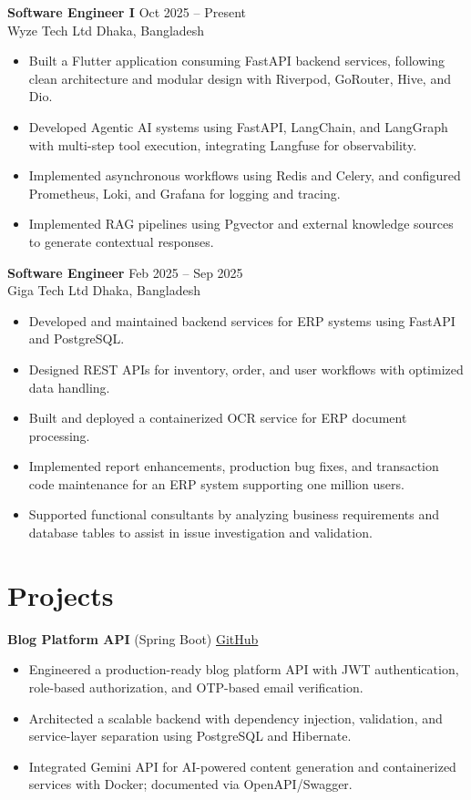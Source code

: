 \documentclass[11pt,a4paper]{article}
\begin{document}
\textbf{Software Engineer I} \hfill Oct 2025 -- Present\\
Wyze Tech Ltd \hfill Dhaka, Bangladesh
\begin{itemize}
    \item Built a Flutter application consuming FastAPI backend services, following clean architecture and modular design with Riverpod, GoRouter, Hive, and Dio.
    \item Developed Agentic AI systems using FastAPI, LangChain, and LangGraph with multi-step tool execution, integrating Langfuse for observability.
    \item Implemented asynchronous workflows using Redis and Celery, and configured Prometheus, Loki, and Grafana for logging and tracing.
    \item Implemented RAG pipelines using Pgvector and external knowledge sources to generate contextual responses.
\end{itemize}

\vspace{4pt}
\textbf{Software Engineer} \hfill Feb 2025 -- Sep 2025\\
Giga Tech Ltd \hfill Dhaka, Bangladesh
\begin{itemize}
    \item Developed and maintained backend services for ERP systems using FastAPI and PostgreSQL.
    \item Designed REST APIs for inventory, order, and user workflows with optimized data handling.
    \item Built and deployed a containerized OCR service for ERP document processing.
    \item Implemented report enhancements, production bug fixes, and transaction code maintenance for an ERP system supporting one million users.
    \item Supported functional consultants by analyzing business requirements and database tables to assist in issue investigation and validation.
\end{itemize}

\section*{Projects}

\textbf{Blog Platform API} (Spring Boot) \hfill \href{https://github.com/amhrahat/springboot_blog_app}{GitHub}
\begin{itemize}
    \item Engineered a production-ready blog platform API with JWT authentication, role-based authorization, and OTP-based email verification.
    \item Architected a scalable backend with dependency injection, validation, and service-layer separation using PostgreSQL and Hibernate.
    \item Integrated Gemini API for AI-powered content generation and containerized services with Docker; documented via OpenAPI/Swagger.
\end{itemize}
\end{document}
